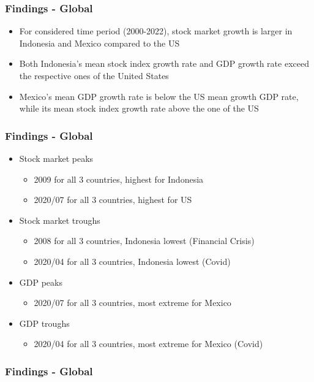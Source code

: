 \documentclass{beamer}
\begin{document}
\begin{frame}
\frametitle{Findings - Global }
\begin{itemize}
\item For considered time period (2000-2022), stock market growth is larger in Indonesia and Mexico compared to the US 
\item Both Indonesia's mean stock index growth rate and GDP growth rate exceed the respective ones of the United States 
\item Mexico's mean GDP growth rate is below the US mean growth GDP rate, while its mean stock index growth rate above the one of the US 
\end{itemize}
\end{frame}

\begin{frame}
\frametitle{Findings - Global}
\begin{itemize}
\item Stock market peaks 
\begin{itemize}
\item 2009 for all 3 countries, highest for Indonesia
\item 2020/07 for all 3 countries, highest for US
\end{itemize}
\item Stock market troughs
\begin{itemize}
\item 2008 for all 3 countries, Indonesia lowest (Financial Crisis)
\item 2020/04 for all 3 countries, Indonesia lowest (Covid)
\end{itemize}


\item GDP peaks
\begin{itemize}
\item 2020/07 for all 3 countries, most extreme for Mexico
\end{itemize}
\item GDP troughs
\begin{itemize}
\item 2020/04 for all 3 countries, most extreme for Mexico (Covid)
\end{itemize}
\end{itemize}
\end{frame}



\begin{frame}
\frametitle{Findings - Global }

\begin{figure}[htbp]
	\centering
	
	\caption{}
\end{figure}

\end{frame}
\end{document}
